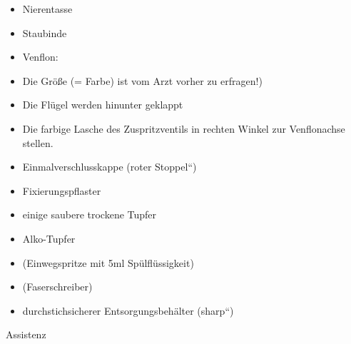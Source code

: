 \documentclass{article}
\begin{document}
\begin{itemize}
\item Nierentasse 

\item Staubinde

\item Venflon: 

\end{itemize}
\begin{itemize}
\item Die Gr\"o{\ss}e (= Farbe) ist vom Arzt vorher zu erfragen!)

\item Die Fl\"ugel werden hinunter geklappt

\item Die farbige Lasche des Zuspritzventils in rechten Winkel zur
Venflonachse stellen.

\end{itemize}
\begin{itemize}
\item Einmalverschlusskappe ({\quotedblbase}roter
Stoppel{\textquotedblleft})

\item Fixierungspflaster

\item einige saubere trockene Tupfer

\item Alko-Tupfer

\item (Einwegspritze mit 5ml Sp\"ulfl\"ussigkeit)

\item (Faserschreiber)

\item durchstichsicherer Entsorgungsbeh\"alter
({\quotedblbase}sharp{\textquotedblleft})

\end{itemize}
Assistenz
\end{document}
